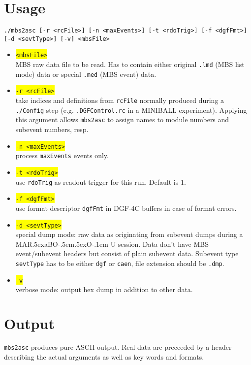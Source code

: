 \documentclass[12pt]{article}
\def\MARaBOU{MAR\lower.5ex\hbox{a}BO\kern-.5em\lower.5ex\hbox{O}\kern-.1em U}%
\newcommand{\yellow}[1]{\colorbox{yellow}{\texttt{#1}}}
\begin{document}
\section{Usage}
\texttt{./mbs2asc [-r <rcFile>] [-n <maxEvents>] [-t <rdoTrig>] [-f <dgfFmt>]}\\
\hspace*{.5\linewidth}\texttt{[-d <sevtType>] [-v] <mbsFile>}
\begin{center}
\begin{itemize}
\setlength{\rightmargin}{1em}%
\setlength{\leftmargin}{2em}%
\setlength{\itemsep}{0pt}%
\setlength{\parskip}{1mm}%
\setlength{\partopsep}{0pt}%
\setlength{\parsep}{0pt}%
\setlength{\topsep}{0pt}%
\item	\yellow{<mbsFile>}\\
	MBS raw data file to be read. Has to contain either original \texttt{.lmd} (MBS list mode) data or special \texttt{.med} (MBS event) data.
\item	\yellow{-r <rcFile>}\\
	take indices and definitions from \texttt{rcFile} normally produced during a \texttt{./Config} step
	(e.g. \texttt{.DGFControl.rc} in a MINIBALL experiment). Applying this argument allows \texttt{mbs2asc} to assign names to module numbers and subevent numbers, resp.
\item	\yellow{-n <maxEvents>}\\
	process \texttt{maxEvents} events only.
\item	\yellow{-t <rdoTrig>}\\
	use \texttt{rdoTrig} as readout trigger for this run. Default is 1.
\item	\yellow{-f <dgfFmt>}\\
	use format descriptor \texttt{dgfFmt} in DGF-4C buffers in case of format errors.
\item	\yellow{-d <sevtType>}\\
	special dump mode: raw data as originating from subevent dumps during a \MARaBOU{} session.
	Data don't have MBS event/subevent headers but consist of plain subevent data.
	Subevent type \texttt{sevtType} has to be either \texttt{dgf} or \texttt{caen}, file extension should be \texttt{.dmp}.
\item	\yellow{-v}\\
	verbose mode: output hex dump in addition to other data.
\end{itemize}
\end{center}
\newpage
\section{Output}
\texttt{mbs2asc} produces pure ASCII output. Real data are preceeded by a header describing the actual arguments as well as key words and formats.
\end{document}
